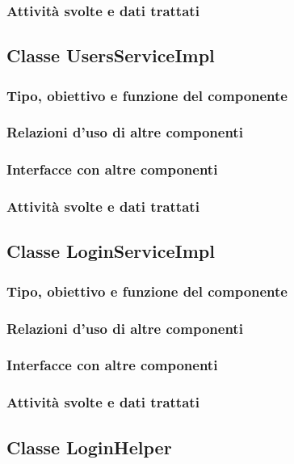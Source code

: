 \subsubsection*{Attivit\`a svolte e dati trattati}

\subsection{Classe UsersServiceImpl}
\subsubsection*{Tipo, obiettivo e funzione del componente}
\subsubsection*{Relazioni d'uso di altre componenti}
\subsubsection*{Interfacce con altre componenti}
\subsubsection*{Attivit\`a svolte e dati trattati}

\subsection{Classe LoginServiceImpl}
\subsubsection*{Tipo, obiettivo e funzione del componente}
\subsubsection*{Relazioni d'uso di altre componenti}
\subsubsection*{Interfacce con altre componenti}
\subsubsection*{Attivit\`a svolte e dati trattati}

\subsection{Classe LoginHelper}
